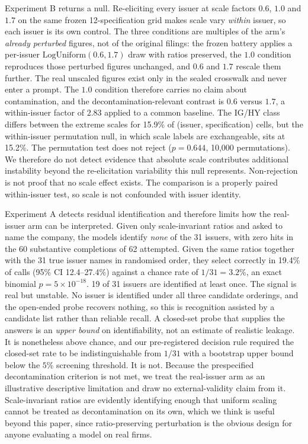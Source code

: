 \documentclass[a4paper,fleqn]{cas-sc}
\begin{document}
Experiment B returns a null. Re-eliciting every issuer at scale factors
$0.6$, $1.0$ and $1.7$ on the same frozen 12-specification grid makes scale vary \emph{within}
issuer, so each issuer is its own control. The three conditions are multiples of the arm's
\emph{already perturbed} figures, not of the original filings: the frozen battery applies a
per-issuer $\mathrm{LogUniform}(0.6,1.7)$ draw with ratios preserved, the $1.0$ condition reproduces
those perturbed figures unchanged, and $0.6$ and $1.7$ rescale them further. The real unscaled
figures exist only in the sealed crosswalk and never enter a prompt. The $1.0$ condition therefore
carries no claim about contamination, and the decontamination-relevant contrast is $0.6$ versus
$1.7$, a within-issuer factor of $2.83$ applied to a common baseline. The IG/HY class differs between the extreme scales for
15.9\% of (issuer, specification) cells, but the within-issuer permutation null, in which scale
labels are exchangeable, sits at 15.2\%. The permutation test does not reject
($p=0.644$, 10{,}000 permutations). We therefore do not detect evidence that absolute scale
contributes additional instability beyond the re-elicitation variability this null represents.
Non-rejection is not proof that no scale effect exists. The comparison is a properly paired within-issuer test, so scale is not confounded with issuer identity.

Experiment A detects residual identification and therefore limits how the real-issuer arm can be interpreted. Given only scale-invariant
ratios and asked to name the company, the models identify \emph{none} of the 31 issuers, with zero hits in the 60 substantive completions of 62 attempted. Given the same ratios together with the 31 true issuer names in randomised
order, they select correctly in 19.4\% of calls (95\% CI 12.4--27.4\%) against a chance rate of
$1/31=3.2$\%, an exact binomial $p=5{\times}10^{-18}$. 19 of 31 issuers are identified at
least once. The signal is real but unstable. No issuer is identified under all three candidate
orderings, and the open-ended probe recovers nothing, so this is recognition assisted by a
candidate list rather than reliable recall. A closed-set probe that supplies the answers is an
\emph{upper bound} on identifiability, not an estimate of realistic leakage. It is nonetheless
above chance, and our pre-registered decision rule required the closed-set rate to be
indistinguishable from $1/31$ with a bootstrap upper bound below the $5$\% screening threshold.
It is not. Because the prespecified decontamination criterion is not met, we treat the real-issuer arm as an illustrative descriptive limitation and draw no external-validity claim from it. Scale-invariant ratios are evidently identifying enough that uniform scaling cannot be
treated as decontamination on its own, which we think is useful beyond this paper, since
ratio-preserving perturbation is the obvious design for anyone evaluating a model on real firms.
\end{document}
